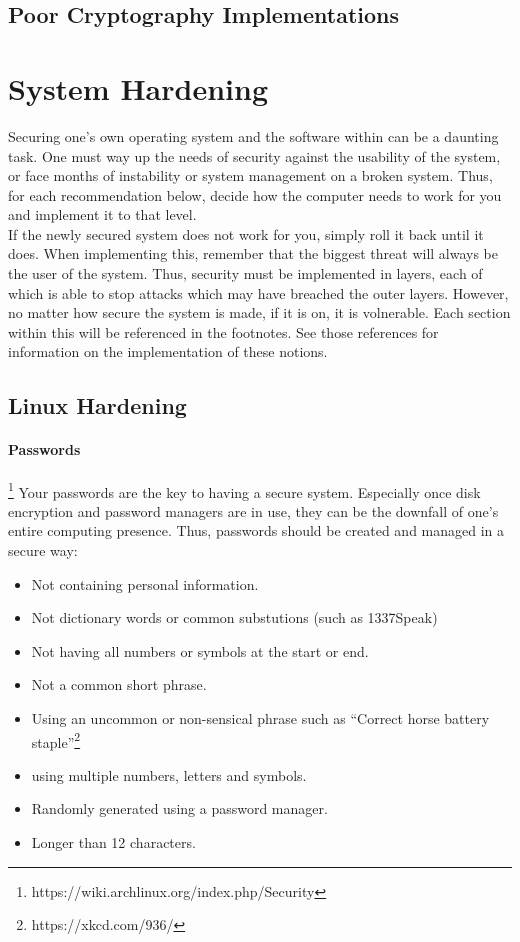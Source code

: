 \documentclass[a4paper,11pt,draft]{article}
\begin{document}
	\subsection{Poor Cryptography Implementations}
\section{System Hardening}
	Securing one's own operating system and the software within can be a daunting task. 
	One must way up the needs of security against the usability of the system, or face months of instability or system management on a broken system. 
	Thus, for each recommendation below, decide how the computer needs to work for you and implement it to that level.\\ 
	If the newly secured system does not work for you, simply roll it back until it does. 
	When implementing this, remember that the biggest threat will always be the user of the system. 
	Thus, security must be implemented in layers, each of which is able to stop attacks which may have breached the outer layers. However, no matter how secure the system is made, if it is on, it is volnerable. 
	Each section within this will be referenced in the footnotes. See those references for information on the implementation of these notions. 
	\subsection{Linux Hardening}
		\paragraph{Passwords} \footnote{https://wiki.archlinux.org/index.php/Security}
			Your passwords are the key to having a secure system. 
			Especially once disk encryption and password managers are in use, they can be the downfall of one's entire computing presence. 
			Thus, passwords should be created and managed in a secure way:
			\begin{itemize}
				\item Not containing personal information.
				\item Not dictionary words or common substutions (such as 1337Speak)
				\item Not having all numbers or symbols at the start or end. 
				\item Not a common short phrase. 
				\item Using an uncommon or non-sensical phrase such as ``Correct horse battery staple''\footnote{https://xkcd.com/936/}
				\item using multiple numbers, letters and symbols. 
				\item Randomly generated using a password manager. %
				\item Longer than 12 characters. 
			\end{itemize}
\end{document}
